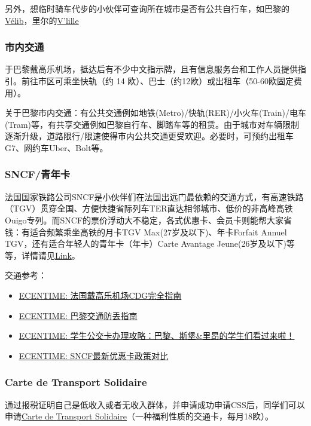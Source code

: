 \documentclass[UTF8]{ctexart}
\begin{document}
另外，想临时骑车代步的小伙伴可查询所在城市是否有公共自行车，如巴黎的\href{http://www.velib.paris/}{Vélib}，里尔的\href{https://www.lillemetropole.fr/votre-quotidien/se-deplacer/se-deplacer-velo}{V’lille} 

\subsubsection{市内交通}
于巴黎戴高乐机场，抵达后有不少中文指示牌，且有信息服务台和工作人员提供指引。前往市区可乘坐快轨（约 14 欧）、巴士（约12欧）或出租车（50-60欧固定费用）。

关于巴黎市内交通：有公共交通例如地铁(Metro)/快轨(RER)/小火车(Train)/电车(Tram)等，有共享交通例如巴黎自行车、脚踏车等的租赁。由于城市对车辆限制逐渐升级，道路限行/限速使得市内公共交通更受欢迎。必要时，可预约出租车G7、网约车Uber、Bolt等。

\subsubsection{SNCF/青年卡}

法国国家铁路公司SNCF是小伙伴们在法国出远门最依赖的交通方式，有高速铁路（TGV）贯穿全国、方便快捷省际列车TER直达相邻城市、低价的非高峰高铁Ouigo专列。而SNCF的票价浮动大不稳定，各式优惠卡、会员卡则能帮大家省钱：有适合频繁乘坐高铁的月卡TGV Max(27岁及以下)、年卡Forfait Annuel TGV，还有适合年轻人的青年卡（年卡）Carte Avantage Jeune(26岁及以下)等等，详情请见\href{https://www.ecentime.com/article/avantage-carte-sncf}{Link}。

交通参考：
\begin{itemize}
    \item \href{https://www.ecentime.com/article/aeroport-CDG%202020}{ECENTIME: 法国戴高乐机场CDG完全指南}
    \item \href{https://www.ecentime.com/article/transport-paris}{ECENTIME: 巴黎交通防丢指南}
    \item \href{https://www.ecentime.com/article/reduction-transport-etudiant}{ECENTIME: 学生公交卡办理攻略：巴黎、斯堡\&里昂的学生们看过来啦！}
    \item \href{https://www.ecentime.com/article/ecentime-sncf-reduction}{ECENTIME: SNCF最新优惠卡政策对比}
\end{itemize}

\subsubsection{Carte de Transport Solidaire}
通过报税证明自己是低收入或者无收入群体，并申请成功申请CSS后，同学们可以申请\href{https://www.solidaritetransport.fr/}{Carte de Transport Solidaire}（一种福利性质的交通卡，每月18欧）。
\end{document}
